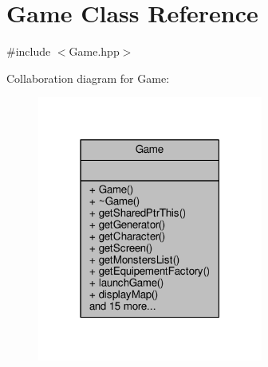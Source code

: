 \hypertarget{class_game}{\section{Game Class Reference}
\label{class_game}
}


{\ttfamily \#include $<$Game.\-hpp$>$}



Collaboration diagram for Game\-:
\nopagebreak
\begin{figure}[H]
\begin{center}
\leavevmode
\includegraphics[width=210pt]{class_game__coll__graph}
\end{center}
\end{figure}

